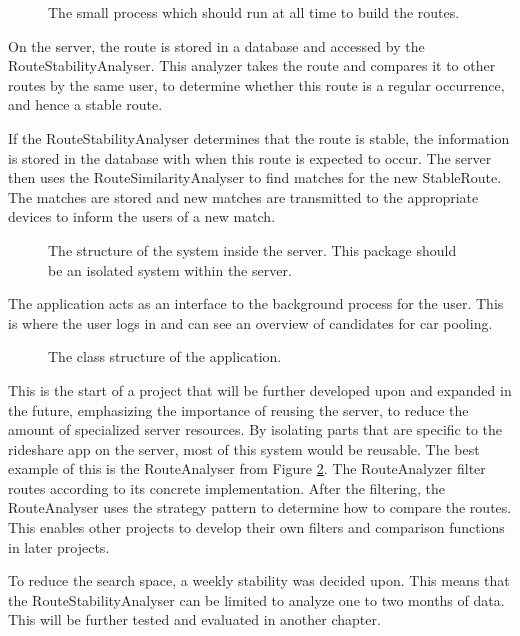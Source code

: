 \begin{figure}[h]
	\centering
	
	\caption{The small process which should run at all time to build the routes.}
	\label{fig:classDiagramSprint1Observer}
\end{figure}


On the server, the route is stored in a database and accessed by the RouteStabilityAnalyser.
This analyzer takes the route and compares it to other routes by the same user, to determine whether this route is a regular occurrence, and hence a stable route.

If the RouteStabilityAnalyser determines that the route is stable, the information is stored in the database with when this route is expected to occur.
The server then uses the RouteSimilarityAnalyser to find matches for the new  StableRoute.
The matches are stored and new matches are transmitted to the appropriate devices to inform the users of a new match.

\begin{figure}[h]
	\centering
	
	\caption{The structure of the system inside the server. This package should be an isolated system within the server.}
	\label{fig:classDiagramSprint1Server}
\end{figure}

The application acts as an interface to the background process for the user.
This is where the user logs in and can see an overview of candidates for car pooling.

\begin{figure}[h]
	\centering
	
	\caption{The class structure of the application.}
	\label{fig:classDiagramSprint1Application}
\end{figure}

This is the start of a project that will be further developed upon and expanded in the future, emphasizing the importance of reusing the server, to reduce the amount of specialized server resources.
By isolating parts that are specific to the rideshare app on the server, most of this system would be reusable.
The best example of this is the RouteAnalyser from Figure \ref{fig:classDiagramSprint1Server}.
The RouteAnalyzer filter routes according to its concrete implementation.
After the filtering, the RouteAnalyser uses the strategy pattern to determine how to compare the routes.
This enables other projects to develop their own filters and comparison functions in later projects.

To reduce the search space, a weekly stability was decided upon. 
This means that the RouteStabilityAnalyser can be limited to analyze one to two months of data.
This will be further tested and evaluated in another chapter. 